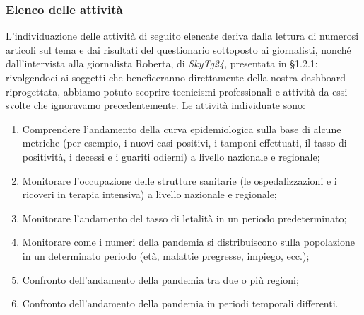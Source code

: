 \subsubsection{Elenco delle attività}
L'individuazione delle attività di seguito elencate deriva dalla lettura di numerosi articoli sul tema e dai risultati del questionario sottoposto ai giornalisti, nonché dall'intervista alla giornalista Roberta, di \textit{SkyTg24}, presentata in §1.2.1: rivolgendoci ai soggetti che beneficeranno direttamente della nostra dashboard riprogettata, abbiamo potuto scoprire tecnicismi professionali e attività da essi svolte che ignoravamo precedentemente.
\noindent
Le attività individuate sono:
\begin{enumerate}
    \item Comprendere l'andamento della curva epidemiologica sulla base di alcune metriche (per esempio, i nuovi casi positivi, i tamponi effettuati, il tasso di positività, i decessi e i guariti odierni) a livello nazionale e regionale;\label{itm:1}
    \item Monitorare l'occupazione delle strutture sanitarie (le ospedalizzazioni e i ricoveri in terapia intensiva) a livello nazionale e regionale;\label{itm:2}
    \item Monitorare l'andamento del tasso di letalità in un periodo predeterminato;\label{itm:3}
    \item Monitorare come i numeri della pandemia si distribuiscono sulla popolazione in un determinato periodo (età, malattie pregresse, impiego, ecc.);\label{itm:4}
    \item Confronto dell'andamento della pandemia tra due o più regioni;\label{itm:5}
    \item Confronto dell'andamento della pandemia in periodi temporali differenti.\label{itm:6}
\end{enumerate}


